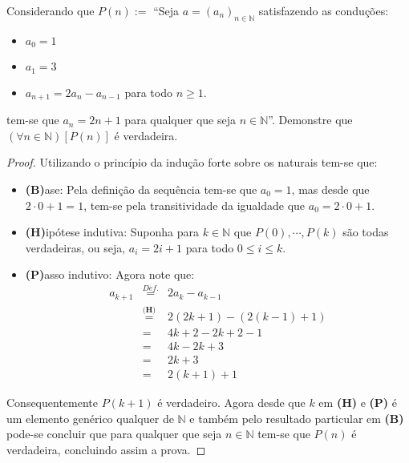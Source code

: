 \begin{exemplo}\label{exe:InducaoForte1}
	Considerando que $\displaystyle P(n) := $ ``Seja $a = (a_n)_{n \in \mathbb{N}}$ satisfazendo as conduções:
	\begin{itemize}
		\item $a_0 = 1$
		\item $a_1 = 3$
		\item $a_{n+1} = 2a_n - a_{n-1}$ para todo $n \ge 1$.
	\end{itemize}
	tem-se que $a_n = 2n + 1$ para qualquer que seja $n \in \mathbb{N}$''. Demonstre que $(\forall n \in \mathbb{N})[P(n)]$ é verdadeira.
	
	\begin{proof}
		Utilizando o princípio da indução forte sobre os naturais tem-se que:
		\begin{itemize}
			\item[ ] \textbf{(B)}ase: Pela definição da sequência tem-se que $a_0 = 1$, mas desde que $2\cdot 0 + 1 = 1$, tem-se pela transitividade da igualdade que $a_0 = 2\cdot 0 + 1$. 
			\item[ ] \textbf{(H)}ipótese indutiva:  Suponha para $k \in \mathbb{N}$ que $P(0), \cdots, P(k)$ são todas verdadeiras, ou seja, $a_i = 2i + 1$ para todo $0 \leq i \leq k$.
			\item[ ] \textbf{(P)}asso indutivo:  Agora note que:
			\begin{eqnarray*}
				a_{k+1} & \stackrel{Def.}{=} & 2a_{k} - a_{k-1}\\
				& \stackrel{\textbf{(H)}}{=} &  2(2k+1) - (2(k-1) + 1)\\
				& = & 4k + 2 - 2k + 2 - 1\\
				& = & 4k - 2k + 3\\
				& = & 2k + 3\\
				& = & 2(k + 1) + 1
			\end{eqnarray*}
		\end{itemize}
		Consequentemente $P(k+1)$ é verdadeiro.  Agora desde que $k$ em \textbf{(H)} e \textbf{(P)} é um elemento genérico qualquer de $\mathbb{N}$ e também pelo resultado particular em  \textbf{(B)} pode-se concluir que para qualquer que seja $n \in \mathbb{N}$ tem-se que $P(n)$ é verdadeira, concluindo assim a prova.
	\end{proof}
\end{exemplo}

